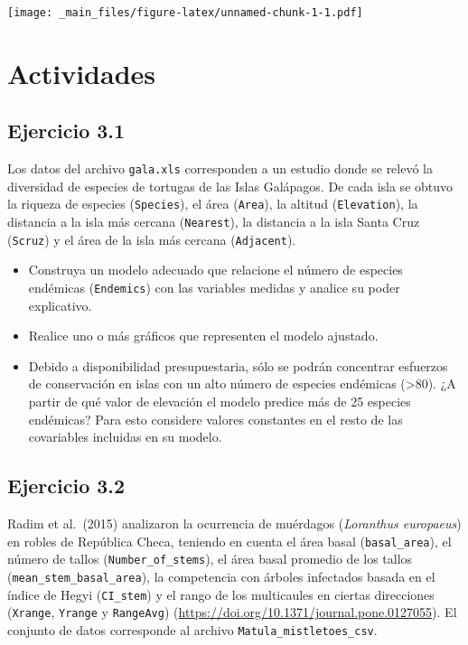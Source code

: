 \documentclass[
]{book}
\begin{document}
\texttt{[image: \_main\_files/figure-latex/unnamed-chunk-1-1.pdf]}

\hypertarget{actividades-2}{%
\section{Actividades}\label{actividades-2}}

\hypertarget{ejercicio-3.1}{%
\subsection{Ejercicio 3.1}\label{ejercicio-3.1}}

Los datos del archivo \texttt{gala.xls} corresponden a un estudio donde se relevó la diversidad de especies de tortugas de las Islas Galápagos. De cada isla se obtuvo la riqueza de especies (\texttt{Species}), el área (\texttt{Area}), la altitud (\texttt{Elevation}), la distancia a la isla más cercana (\texttt{Nearest}), la distancia a la isla Santa Cruz (\texttt{Scruz}) y el área de la isla más cercana (\texttt{Adjacent}).

\begin{itemize}
\item
  Construya un modelo adecuado que relacione el número de especies endémicas (\texttt{Endemics}) con las variables medidas y analice su poder explicativo.
\item
  Realice uno o más gráficos que representen el modelo ajustado.
\item
  Debido a disponibilidad presupuestaria, sólo se podrán concentrar esfuerzos de conservación en islas con un alto número de especies endémicas (\textgreater80). ¿A partir de qué valor de elevación el modelo predice más de 25 especies endémicas? Para esto considere valores constantes en el resto de las covariables incluidas en su modelo.
\end{itemize}

\hypertarget{ejercicio-3.2}{%
\subsection{Ejercicio 3.2}\label{ejercicio-3.2}}

Radim et al.~(2015) analizaron la ocurrencia de muérdagos (\emph{Loranthus europaeus}) en robles de República Checa, teniendo en cuenta el área basal (\texttt{basal\_area}), el número de tallos (\texttt{Number\_of\_stems}), el área basal promedio de los tallos (\texttt{mean\_stem\_basal\_area}), la competencia con árboles infectados basada en el índice de Hegyi (\texttt{CI\_stem}) y el rango de los multicaules en ciertas direcciones (\texttt{Xrange}, \texttt{Yrange} y \texttt{RangeAvg}) (\url{https://doi.org/10.1371/journal.pone.0127055}). El conjunto de datos corresponde al archivo \texttt{Matula\_mistletoes\_csv}.
\end{document}
